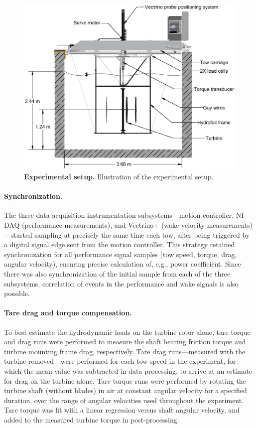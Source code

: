 \documentclass[10pt,letterpaper]{article}
\begin{document}
\begin{figure}
    \centering

    \includegraphics[clip,trim=0.01in 0 0 0, width=\textwidth]{figures/tank_cross_section}

    \caption{{\bf Experimental setup.} Illustration of the experimental setup.}

    \label{fig:exp-setup}
\end{figure}


\paragraph{Synchronization.} The three data acquisition instrumentation
subsystems---motion controller, NI DAQ (performance measurements), and Vectrino+
(wake velocity measurements)---started sampling at precisely the same time each
tow, after being triggered by a digital signal edge sent from the motion
controller. This strategy retained synchronization for all performance signal
samples (tow speed, torque, drag, angular velocity), ensuring precise
calculation of, e.g., power coefficient. Since there was also synchronization of
the initial sample from each of the three subsystems, correlation of events in
the performance and wake signals is also possible.

\paragraph{Tare drag and torque compensation.} To best estimate the hydrodynamic
loads on the turbine rotor alone, tare torque and drag runs were performed to
measure the shaft bearing friction torque and turbine mounting frame drag,
respectively. Tare drag runs---measured with the turbine removed---were
performed for each tow speed in the experiment, for which the mean value was
subtracted in data processing, to arrive at an estimate for drag on the turbine
alone. Tare torque runs were performed by rotating the turbine shaft (without
blades) in air at constant angular velocity for a specified duration, over the
range of angular velocities used throughout the experiment. Tare torque was fit
with a linear regression versus shaft angular velocity, and added to the
measured turbine torque in post-processing.
\end{document}
